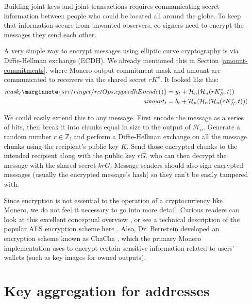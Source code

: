 Building joint keys and joint transactions requires communicating secret information between people who could be located all around the globe. To keep that information secure from unwanted observers, co-signers need to encrypt the messages they send each other.

A very simple way to encrypt messages using elliptic curve cryptography is via Diffie-Hellman exchange (ECDH). We already mentioned this in Section \ref{amount-commitments}, where Monero output commitment mask and amount are communicated to receivers via the shared secret $r K^v$. It looked like this:
\begin{align*}
  \mathit{mask}_t\marginnote{src/ringct/ rctOps.cpp ecdhEncode()}     &= y_t + \mathcal{H}_n(\mathcal{H}_n(r K_B^v, t)) \\
  \mathit{amount}_t   &= b_t + \mathcal{H}_n(\mathcal{H}_n(\mathcal{H}_n(r K_B^v, t)))
\end{align*}

We could easily extend this to any message. First encode the message as a series of bits, then break it into chunks equal in size to the output of $\mathcal{H}_n$. Generate a random number $r \in \mathbb{Z}_l$ and perform a Diffie-Hellman exchange on all the message chunks using the recipient's public key $K$. Send those encrypted chunks to the intended recipient along with the public key $r G$, who can then decrypt the message with the shared secret $k r G$. Message senders should also sign encrypted messages (usually the encrypted message's hash) so they can't be easily tampered with.

Since encryption is not essential to the operation of a cryptocurrency like Monero, we do not feel it necessary to go into more detail. Curious readers can look at this excellent conceptual overview \cite{tutorialspoint-cryptography}, or see a technical description of the popular AES encryption scheme here \cite{AES-encryption}. Also, Dr. Bernstein developed an encryption scheme known as ChaCha \cite{Bernstein_chacha,chacha-irtf}, which the primary Monero implementation uses to encrypt certain sensitive information related to users' wallets (such as key images for owned outputs).



\section{Key aggregation for addresses}
\label{sec:key-aggregation}

